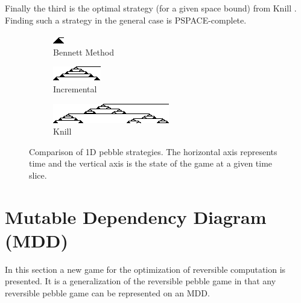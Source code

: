 Finally the third is the optimal strategy (for a given space bound) from Knill
\cite{knill:95}. Finding such a strategy in the general case is
PSPACE-complete.



\begin{figure}
  \centering
  \begin{subfigure}{0.3\textwidth}
    \centering
    \includegraphics{images/Pebble1.png}
    \caption{Bennett Method}
  \end{subfigure}
  \begin{subfigure}{0.3\textwidth}
    \centering
    \includegraphics{images/Pebble2.png}
    \caption{Incremental}
  \end{subfigure}\begin{subfigure}{0.3\textwidth}
    \centering
    \includegraphics{images/Pebble3.png}
    \caption{Knill}
  \end{subfigure}
  \label{fig:pebble}
  \caption{Comparison of 1D pebble strategies. The horizontal axis represents
  time and the vertical axis is the state of the game at a given time slice.}
\end{figure}

\section{Mutable Dependency Diagram (MDD)}


In this section a new game for the optimization of reversible computation is
presented. It is a generalization of the reversible pebble game in that any
reversible pebble game can be represented on an MDD.

